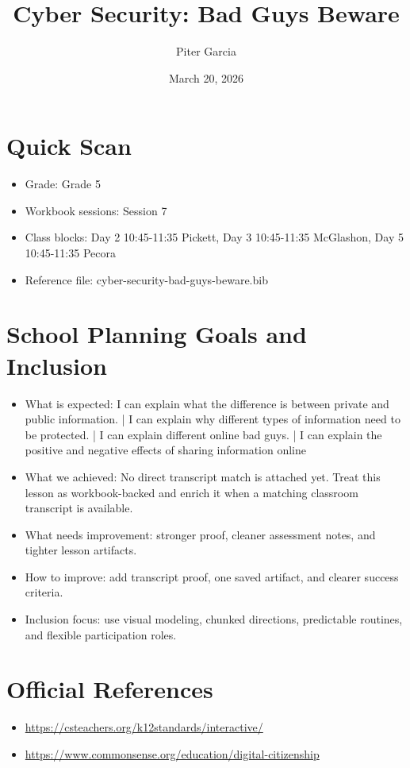 \documentclass[11pt]{article}
\title{Cyber Security: Bad Guys Beware}
\author{Piter Garcia}
\date{March 20, 2026}
\begin{document}
    \maketitle
    \section*{Quick Scan}
    \begin{itemize}[leftmargin=*]
    \item Grade: Grade 5
    \item Workbook sessions: Session 7
    \item Class blocks: Day 2 10:45-11:35 Pickett, Day 3 10:45-11:35 McGlashon, Day 5 10:45-11:35 Pecora
    \item Reference file: cyber-security-bad-guys-beware.bib
    \end{itemize}
    \section*{School Planning Goals and Inclusion}
    \begin{itemize}[leftmargin=*]
    \item What is expected: I can explain what the difference is between private and public information. | I can explain why different types of information need to be protected. | I can explain different online bad guys. | I can explain the positive and negative effects of sharing information online
    \item What we achieved: No direct transcript match is attached yet. Treat this lesson as workbook-backed and enrich it when a matching classroom transcript is available.
    \item What needs improvement: stronger proof, cleaner assessment notes, and tighter lesson artifacts.
    \item How to improve: add transcript proof, one saved artifact, and clearer success criteria.
    \item Inclusion focus: use visual modeling, chunked directions, predictable routines, and flexible participation roles.
    \end{itemize}
    \section*{Official References}
    \begin{itemize}[leftmargin=*]
    \item \url{https://csteachers.org/k12standards/interactive/}
\item \url{https://www.commonsense.org/education/digital-citizenship}

    \end{itemize}
    
\end{document}
